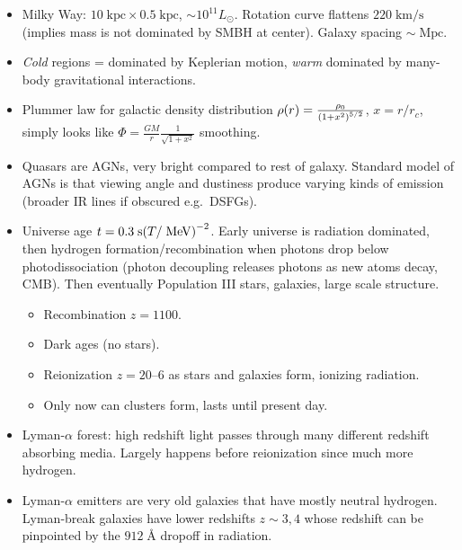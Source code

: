 \documentclass[11pt,
        usenames, %
        dvipsnames %
    ]{article}
\newcommand*{\ang}[0]{\;\text{\AA}}
\DeclarePairedDelimiter\p{\lparen}{\rparen}
\begin{document}
\begin{itemize}
    \item Milky Way: $10\;\mathrm{kpc} \times 0.5\;\mathrm{kpc}$,
        $\sim 10^{11}L_{\odot}$. Rotation curve flattens $220\;\mathrm{km/s}$
        (implies mass is not dominated by SMBH at center). Galaxy spacing $\sim
        \;\mathrm{Mpc}$.

    \item \emph{Cold} regions = dominated by Keplerian motion, \emph{warm}
        dominated by many-body gravitational interactions.

    \item Plummer law for galactic density distribution $\rho(r) =
        \frac{\rho_0}{\p*{1 + x^2}^{5/2}}$, $x = r/r_c$, simply looks like $\Phi
        = \frac{GM}{r}\frac{1}{\sqrt{1 + x^2}}$ smoothing.

    \item Quasars are AGNs, very bright compared to rest of galaxy. Standard
        model of AGNs is that viewing angle and dustiness produce varying kinds
        of emission (broader IR lines if obscured e.g.\ DSFGs).

    \item Universe age $t = 0.3\;\mathrm{s}\p*{T/\;\mathrm{MeV}}^{-2}$. Early
        universe is radiation dominated, then hydrogen formation/recombination
        when photons drop below photodissociation (photon decoupling releases
        photons as new atoms decay, CMB). Then eventually Population III stars,
        galaxies, large scale structure.
        \begin{itemize}
            \item Recombination $z = 1100$.
            \item Dark ages (no stars).
            \item Reionization $z = 20$--$6$ as stars and galaxies form,
                ionizing radiation.

            \item Only now can clusters form, lasts until present day.
        \end{itemize}

    \item Lyman-$\alpha$ forest: high redshift light passes through many
        different redshift absorbing media. Largely happens before reionization
        since much more hydrogen.

    \item Lyman-$\alpha$ emitters are very old galaxies that have mostly neutral
        hydrogen. Lyman-break galaxies have lower redshifts $z \sim 3, 4$ whose
        redshift can be pinpointed by the $912\ang$ dropoff in radiation.


\end{itemize}
\end{document}
